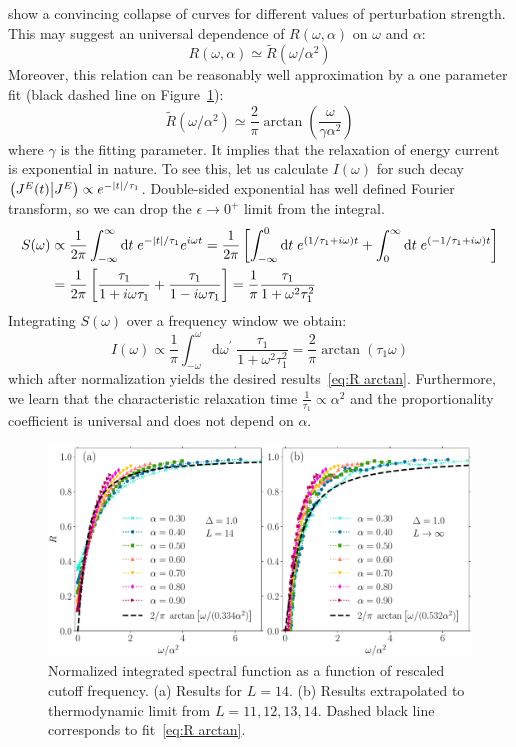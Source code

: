 show a convincing collapse of curves for different values of perturbation strength. This may suggest
an universal dependence of \(R(\omega,\alpha)\) on \(\omega\) and \(\alpha\):
\begin{equation}
  R(\omega,\alpha)\simeq \tilde{R}(\omega/\alpha^2)
\end{equation}
Moreover, this relation can be reasonably well approximation by a one parameter fit
(black dashed line on Figure~\ref{fig:current decay scaling}):
\begin{equation}
  \tilde{R}(\omega/\alpha^2) \simeq \frac{2}{\pi} \arctan\left(\frac{\omega}{\gamma \alpha^2}\right)
\label{eq:R arctan}
\end{equation}
where \(\gamma \) is the fitting parameter. It implies that the relaxation of energy current
is exponential in nature. To see this, let us calculate \(I(\omega)\) for such decay
\(\left(J^E(t) \middle| J^E\right) \propto e^{-\abs{t}/\tau_1}\). Double-sided exponential has well defined Fourier
transform, so we can drop the \(\epsilon \to 0^{+}\) limit from the integral.
\begin{align}
  S(\omega) &\propto \frac{1}{2\pi} \int_{-\infty}^{\infty} \mathrm{d} t\; e^{-\abs{t}/\tau_1} e^{i \omega t} = 
  \frac{1}{2\pi} \left[\int_{-\infty}^{0} \mathrm{d} t\; e^{(1/\tau_1 + i\omega)t }
  + \int_{0}^{\infty} \mathrm{d} t\; e^{(-1/\tau_1 + i\omega)t }  \right] \nonumber \\
  &= \frac{1}{2\pi} \left[\frac{\tau_1}{1+i\omega \tau_1} + \frac{\tau_1}{1-i\omega\tau_1}\right] = 
  \frac{1}{\pi} \frac{\tau_1}{1+\omega^2\tau_1^2}
\end{align}
Integrating \(S(\omega)\) over a frequency window we obtain:
\begin{equation*}
  I(\omega) \propto \frac{1}{\pi}\int_{-\omega}^{\omega}\mathrm{d}\omega^{\prime}\; 
  \frac{\tau_1}{1+\omega^2\tau_1^2} = \frac{2}{\pi} \arctan(\tau_1 \omega)
\end{equation*}
which after normalization yields the desired results~\eqref{eq:R arctan}. Furthermore, we learn that the 
characteristic relaxation time \(\frac{1}{\tau_1} \propto \alpha^2\) and the proportionality
coefficient is universal and does not depend on \(\alpha\).
\begin{figure}[htbp]
  \centering
  \includegraphics[width=\textwidth]{Figures/current_scaling.pdf}
  \caption{Normalized integrated spectral function as a function of rescaled cutoff frequency.
  (a) Results for \(L=14\). (b) Results extrapolated to thermodynamic limit from \(L=11,12,13,14\).
  Dashed black line corresponds to fit~\eqref{eq:R arctan}.}
  \label{fig:current decay scaling}
\end{figure}
